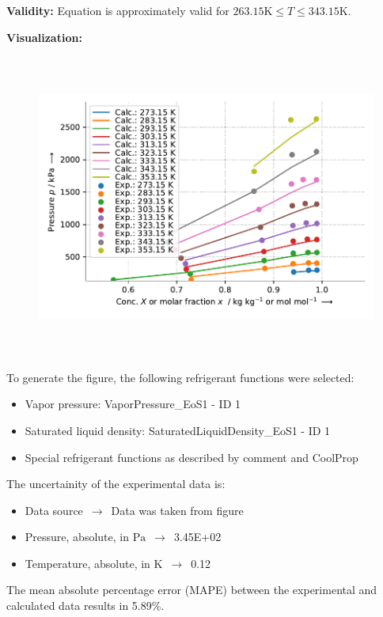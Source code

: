 \textbf{Validity:}
\newline
Equation is approximately valid for $263.15 \si{\kelvin} \leq T \leq 343.15 \si{\kelvin}$.
\newline

\textbf{Visualization:}
%
\begin{figure}[!htp]
{\noindent\includegraphics[height=10cm, keepaspectratio]{figs/abs/abs_R-134a_lubricant_PAG_WilsonFixedDl_1.pdf}}
\end{figure}
%

To generate the figure, the following refrigerant functions were selected:
\begin{itemize}
\item Vapor pressure: VaporPressure\_EoS1 - ID 1
\item Saturated liquid density: SaturatedLiquidDensity\_EoS1 - ID 1
\item Special refrigerant functions as described by comment and CoolProp
\end{itemize}

The uncertainity of the experimental data is:
\begin{itemize}
\item Data source $\,\to\,$ Data was taken from figure
\item Pressure, absolute, in $\si{\pascal}$ $\,\to\,$ 3.45E+02
\item Temperature, absolute, in $\si{\kelvin}$ $\,\to\,$ 0.12
\end{itemize}

The mean absolute percentage error (MAPE) between the experimental and calculated data results in 5.89\%.
\FloatBarrier
\newpage
